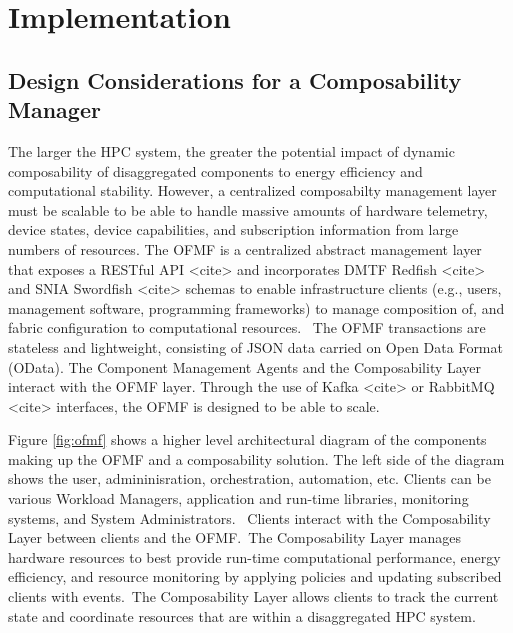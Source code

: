 \section{Implementation}

\subsection{Design Considerations for a Composability Manager}

The larger the HPC system, the greater the potential impact of dynamic composability of disaggregated components to energy efficiency and computational stability.  However, a centralized composabilty management layer must be scalable to be able to handle massive amounts of hardware telemetry, device states, device capabilities, and subscription information from large numbers of resources.  The OFMF is a centralized abstract management layer that exposes a RESTful API <cite> and incorporates DMTF Redfish <cite> and SNIA Swordfish <cite> schemas to enable infrastructure clients (e.g., users, management software, programming frameworks) to manage composition of, and fabric configuration to computational resources.  The OFMF transactions are stateless and lightweight, consisting of JSON data carried on Open Data Format (OData).  The Component Management Agents and the Composability Layer interact with the OFMF layer.  Through the use of Kafka <cite> or RabbitMQ <cite> interfaces, the OFMF is designed to be able to scale.

Figure \ref{fig:ofmf} shows a higher level architectural diagram of the components making up the OFMF and a composability solution.  The left side of the diagram shows the user, admininisration, orchestration, automation, etc. Clients can be various Workload Managers, application and run-time libraries, monitoring systems, and System Administrators.  Clients interact with the Composability Layer between clients and the OFMF. The Composability Layer manages hardware resources to best provide run-time computational performance, energy efficiency, and resource monitoring by applying policies and updating subscribed clients with events. The Composability Layer allows clients to track the current state and coordinate resources that are within a disaggregated HPC system.

